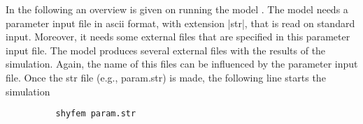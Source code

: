 
%
%
%
%
%
%
%

In the following an overview is given on running the model \shy{}. The
model needs a parameter input file in ascii format, with extension |str|,
that is read on standard input. Moreover, it needs some external files
that are specified in this parameter input file. The model produces
several external files with the results of the simulation. Again, the
name of this files can be influenced by the parameter input file.
Once the str file (e.g., param.str) is made, the following line starts the simulation

\begin{verbatim}
          shyfem param.str
\end{verbatim}


